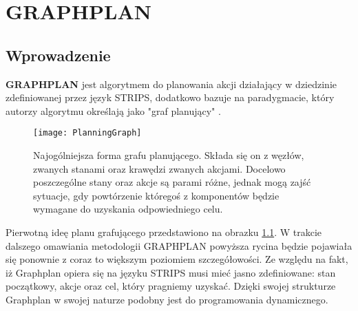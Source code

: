 \chapter{GRAPHPLAN}
\thispagestyle{chapterBeginStyle}

\section{Wprowadzenie}
    \textbf{GRAPHPLAN} jest algorytmem do planowania akcji działający w dziedzinie zdefiniowanej
    przez język STRIPS, dodatkowo bazuje na paradygmacie, który autorzy algorytmu określają jako "graf planujący" \cite{GRAPHPLAN}.
    \begin{figure}[H]
        \texttt{[image: PlanningGraph]}
        \centering
        \caption{Najogólniejsza forma grafu planującego. Składa się on z węzłów, zwanych stanami oraz krawędzi zwanych akcjami. Docelowo poszczególne 
        stany oraz akcje są parami różne, jednak mogą zajść sytuacje, gdy powtórzenie któregoś z komponentów będzie wymagane do uzyskania odpowiedniego
        celu.}
        \label{PlanningGraph}
    \end{figure}
    Pierwotną ideę planu grafującego przedstawiono na obrazku \ref{PlanningGraph}. W trakcie dalszego omawiania metodologii GRAPHPLAN powyższa 
    rycina będzie pojawiała się ponownie z coraz to większym poziomiem szczegółowości.
    Ze względu na fakt, iż Graphplan opiera się na języku STRIPS musi mieć jasno zdefiniowane: stan początkowy, akcje oraz cel, który pragniemy uzyskać.
    Dzięki swojej strukturze Graphplan w swojej naturze podobny jest do programowania dynamicznego.

